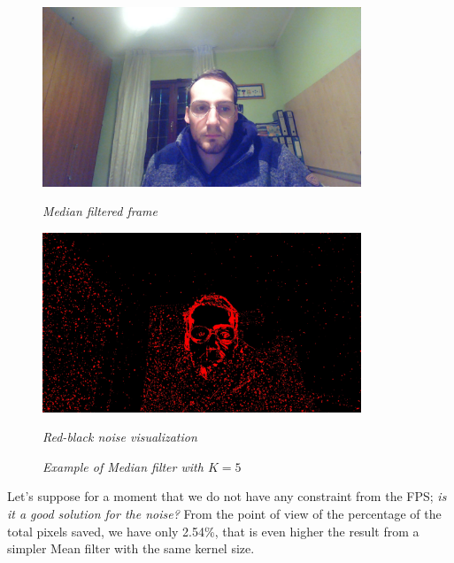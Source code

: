\documentclass[paper=a4, fontsize=10pt]{scrartcl}	%
\begin{document}
		
	\begin{figure}[H]
		\centering
		\begin{minipage}[b]{0.45\textwidth}
			\centering
			\includegraphics[width=0.85\textwidth]{images/heatmap/img_median_or.jpg}
			\caption{\textit{Median filtered frame}}
		\end{minipage}
		\hfill
		\begin{minipage}[b]{0.45\textwidth}
			\centering
			\includegraphics[width=0.85\textwidth]{images/heatmap/img_median_red.jpg}
			\caption{\textit{Red-black noise visualization}}
		\end{minipage}
		\caption{\textit{Example of Median filter with $K = 5$}}
	\end{figure}

	Let's suppose for a moment that we do not have any constraint from the FPS; \textit{is it a good solution for the noise?} From the point of view of the percentage of the total pixels saved, we have only 2.54\%, that is even higher the result from a simpler Mean filter with the same kernel size.
	
\end{document}
